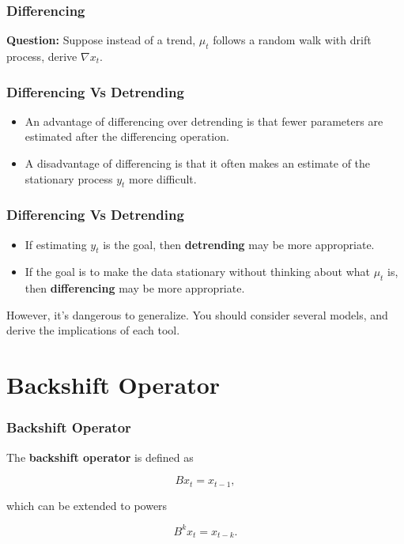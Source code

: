 \documentclass[%
xcolor=pdftex]{beamer}
\begin{document}
\begin{frame}
\frametitle{Differencing}

\textbf{Question:} Suppose instead of a trend, $\mu_t$ follows a random walk with drift process, derive $\nabla x_t$.

\vspace{50mm}

\end{frame}

\begin{frame}
\frametitle{Differencing Vs Detrending}

\begin{itemize}
\item An advantage of differencing over detrending is that fewer parameters are estimated after the differencing operation.
\item A disadvantage of differencing is that it often makes an estimate of the stationary process $y_t$ more difficult.
\end{itemize}



\end{frame}

\begin{frame}
\frametitle{Differencing Vs Detrending}

\begin{itemize}
\item If estimating $y_t$ is the goal, then \textbf{detrending} may be more appropriate.
\item If the goal is to make the data stationary without thinking about what $\mu_t$ is, then \textbf{differencing} may be more appropriate.
\end{itemize}

However, it's dangerous to generalize. You should consider several models, and derive the implications of each tool.
\end{frame}

\section{Backshift Operator}
\frame{\tableofcontents[currentsection]}

\begin{frame}
\frametitle{Backshift Operator}

The \textbf{backshift operator} is defined as

\begin{equation*}
B x_t = x_{t-1},
\end{equation*}

which can be extended to powers

\begin{equation}
B^k x_t = x_{t-k}.
\end{equation}

\end{frame}
\end{document}
